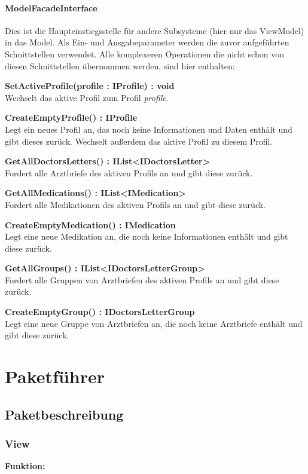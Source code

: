 \documentclass[a4paper]{scrreprt}
\begin{document}
\subsubsection{ModelFacadeInterface}
Dies ist die Haupteinstiegsstelle für andere Subsysteme (hier nur das ViewModel) in das Model. Als Ein- und Ausgabeparameter werden die zuvor aufgeführten Schnittstellen verwendet. Alle komplexeren Operationen die nicht schon von diesen Schnittstellen übernommen werden, sind hier enthalten:

\textbf{SetActiveProfile(profile : IProfile) : void}\\
Wechselt das aktive Profil zum Profil \textit{profile}.

\textbf{CreateEmptyProfile() : IProfile}\\
Legt ein neues Profil an, das noch keine Informationen und Daten enthält und gibt dieses zurück. Wechselt außerdem das aktive Profil zu diesem Profil.

\textbf{GetAllDoctorsLetters() : IList<IDoctorsLetter>}\\
Fordert alle Arztbriefe des aktiven Profils an und gibt diese zurück.

\textbf{GetAllMedications() : IList<IMedication>}\\
Fordert alle Medikationen des aktiven Profils an und gibt diese zurück.

\textbf{CreateEmptyMedication() : IMedication}\\
Legt eine neue Medikation an, die noch keine Informationen enthält und gibt diese zurück.

\textbf{GetAllGroups() : IList<IDoctorsLetterGroup>}\\
Fordert alle Gruppen von Arztbriefen des aktiven Profils an und gibt diese zurück.

\textbf{CreateEmptyGroup() : IDoctorsLetterGroup}\\
Legt eine neue Gruppe von Arztbriefen an, die noch keine Arztbriefe enthält und gibt diese zurück.

\chapter{Paketführer}
\section{Paketbeschreibung}
\subsection{View}
\textbf{Funktion:} %
\end{document}
